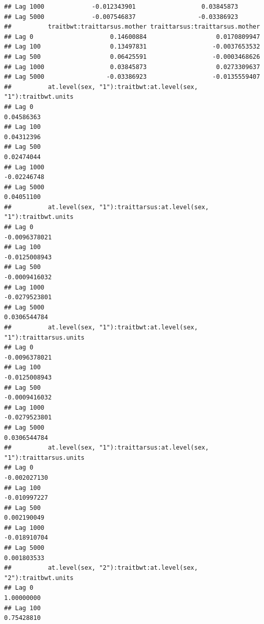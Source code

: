 \documentclass[
  12pt,
]{book}
\begin{document}
\begin{verbatim}
## Lag 1000             -0.012343901                  0.03845873
## Lag 5000             -0.007546837                 -0.03386923
##          traitbwt:traittarsus.mother traittarsus:traittarsus.mother
## Lag 0                     0.14600884                   0.0170809947
## Lag 100                   0.13497831                  -0.0037653532
## Lag 500                   0.06425591                  -0.0003468626
## Lag 1000                  0.03845873                   0.0273309637
## Lag 5000                 -0.03386923                  -0.0135559407
##          at.level(sex, "1"):traitbwt:at.level(sex, "1"):traitbwt.units
## Lag 0                                                       0.04586363
## Lag 100                                                     0.04312396
## Lag 500                                                     0.02474044
## Lag 1000                                                   -0.02246748
## Lag 5000                                                    0.04051100
##          at.level(sex, "1"):traittarsus:at.level(sex, "1"):traitbwt.units
## Lag 0                                                       -0.0096378021
## Lag 100                                                     -0.0125008943
## Lag 500                                                     -0.0009416032
## Lag 1000                                                    -0.0279523801
## Lag 5000                                                     0.0306544784
##          at.level(sex, "1"):traitbwt:at.level(sex, "1"):traittarsus.units
## Lag 0                                                       -0.0096378021
## Lag 100                                                     -0.0125008943
## Lag 500                                                     -0.0009416032
## Lag 1000                                                    -0.0279523801
## Lag 5000                                                     0.0306544784
##          at.level(sex, "1"):traittarsus:at.level(sex, "1"):traittarsus.units
## Lag 0                                                           -0.002027130
## Lag 100                                                         -0.010997227
## Lag 500                                                          0.002190049
## Lag 1000                                                        -0.018910704
## Lag 5000                                                         0.001803533
##          at.level(sex, "2"):traitbwt:at.level(sex, "2"):traitbwt.units
## Lag 0                                                       1.00000000
## Lag 100                                                     0.75428810

\end{verbatim}
\end{document}
